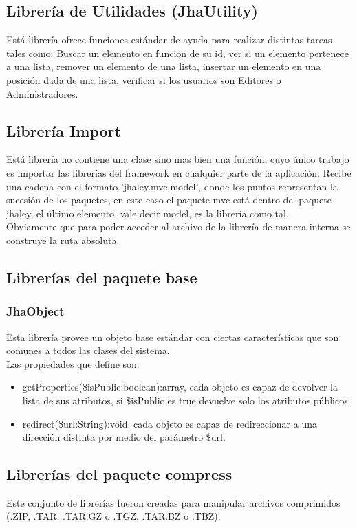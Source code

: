 \subsection{Librer\'ia de Utilidades (JhaUtility)}
Est\'a librer\'ia ofrece funciones est\'andar de ayuda para realizar distintas tareas tales como: Buscar un elemento en funcion de su id, ver si un elemento pertenece a una lista, remover un elemento de una lista, insertar un elemento en una posici\'on dada de una lista, verificar si los usuarios son Editores o Administradores.

\subsection{Librer\'ia Import}
Est\'a librer\'ia no contiene una clase sino mas bien una funci\'on, cuyo \'unico trabajo es importar las librer\'ias del framework en cualquier parte de la aplicaci\'on. Recibe una cadena con el formato \textsf{'jhaley.mvc.model'}, donde los puntos representan la sucesi\'on de los paquetes, en este caso el paquete \textsf{mvc} est\'a dentro del paquete \textsf{jhaley}, el \'ultimo elemento, vale decir \textsf{model}, es la librer\'ia como tal.\\
Obviamente que para poder acceder al archivo de la librer\'ia de manera interna se construye la ruta absoluta.

\subsection{Librer\'ias del paquete \textsf{base}}
\subsubsection{JhaObject}
Esta librer\'ia provee un objeto base est\'andar con ciertas caracter\'isticas que son comunes a todos las clases del sistema.\\Las propiedades que define son: 
\begin{itemize}
\item \textsf{getProperties(\$isPublic:boolean):array}, cada objeto es capaz de devolver la lista de sus atributos, si \textsf{\$isPublic} es \textsf{true} devuelve solo los atributos p\'ublicos.
\item \textsf{redirect(\$url:String):void}, cada objeto es capaz de redireccionar a una direcci\'on distinta por medio del par\'ametro \textsf{\$url}.
\end{itemize}

\subsection{Librer\'ias del paquete \textsf{compress}}
Este conjunto de librer\'ias fueron creadas para manipular archivos comprimidos (.ZIP, .TAR, .TAR.GZ o .TGZ, .TAR.BZ o .TBZ).
